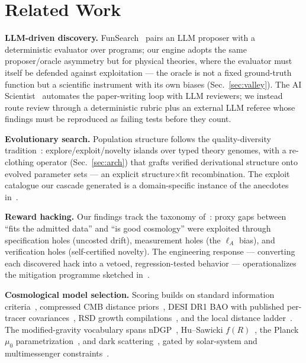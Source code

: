 \documentclass[journal]{IEEEtran}
\newcommand{\lA}{\ell_A}
\begin{document}
\section{Related Work}
\label{sec:related}
\textbf{LLM-driven discovery.} FunSearch~\cite{funsearch2024} pairs an LLM proposer with
a deterministic evaluator over programs; our engine adopts the same proposer/oracle
asymmetry but for physical theories, where the evaluator must itself be defended against
exploitation --- the oracle is not a fixed ground-truth function but a scientific
instrument with its own biases (Sec.~\ref{sec:valley}). The AI
Scientist~\cite{aiscientist2024} automates the paper-writing loop with LLM reviewers; we
instead route review through a deterministic rubric plus an external LLM referee whose
findings must be reproduced as failing tests before they count.

\textbf{Evolutionary search.} Population structure follows the quality-diversity
tradition~\cite{mapelites2015,noveltysearch2011}: explore/exploit/novelty islands over
typed theory genomes, with a re-clothing operator (Sec.~\ref{sec:arch}) that grafts
verified derivational structure onto evolved parameter sets --- an explicit
structure$\times$fit recombination. The exploit catalogue our cascade generated is a
domain-specific instance of the anecdotes in~\cite{lehman2020}.

\textbf{Reward hacking.} Our findings track the taxonomy of~\cite{skalse2022}: proxy
gaps between ``fits the admitted data'' and ``is good cosmology'' were exploited through
specification holes (uncosted drift), measurement holes (the $\lA$ bias), and
verification holes (self-certified novelty). The engineering response --- converting each
discovered hack into a vetoed, regression-tested behavior --- operationalizes the
mitigation programme sketched in~\cite{amodei2016,pan2022}.

\textbf{Cosmological model selection.} Scoring builds on standard information
criteria~\cite{akaike1974,schwarz1978,kassraftery1995,burnham2004}, compressed CMB
distance priors~\cite{chen2019}, DESI DR1 BAO with published per-tracer
covariances~\cite{desi2024}, RSD growth compilations~\cite{eboss2021}, and the local
distance ladder~\cite{riess2022}. The modified-gravity vocabulary spans
nDGP~\cite{dgp2000,koyama2006}, Hu--Sawicki $f(R)$~\cite{husawicki2007}, the Planck
$\mu_0$ parametrization~\cite{planckmg2015}, and dark
scattering~\cite{simpson2010,pourtsidou2013}, gated by solar-system and multimessenger
constraints~\cite{cassini2003,vainshtein1972,khoury2004,gw170817,creminelli2017}.
\end{document}
